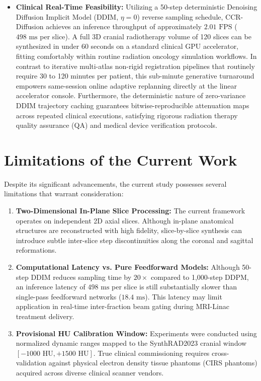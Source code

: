 \begin{itemize}
    \item \textbf{Clinical Real-Time Feasibility:} Utilizing a 50-step deterministic Denoising Diffusion Implicit Model (DDIM, $\eta = 0$) reverse sampling schedule, CCR-Diffusion achieves an inference throughput of approximately $2.01\text{ FPS}$ ($498\text{ ms}$ per slice). A full 3D cranial radiotherapy volume of 120 slices can be synthesized in under 60 seconds on a standard clinical GPU accelerator, fitting comfortably within routine radiation oncology simulation workflows. In contrast to iterative multi-atlas non-rigid registration pipelines that routinely require 30 to 120 minutes per patient, this sub-minute generative turnaround empowers same-session online adaptive replanning directly at the linear accelerator console. Furthermore, the deterministic nature of zero-variance DDIM trajectory caching guarantees bitwise-reproducible attenuation maps across repeated clinical executions, satisfying rigorous radiation therapy quality assurance (QA) and medical device verification protocols.
\end{itemize}

\section{Limitations of the Current Work}
Despite its significant advancements, the current study possesses several limitations that warrant consideration:
\begin{enumerate}
    \item \textbf{Two-Dimensional In-Plane Slice Processing:} The current framework operates on independent 2D axial slices. Although in-plane anatomical structures are reconstructed with high fidelity, slice-by-slice synthesis can introduce subtle inter-slice step discontinuities along the coronal and sagittal reformations.
    \item \textbf{Computational Latency vs. Pure Feedforward Models:} Although 50-step DDIM reduces sampling time by $20\times$ compared to 1,000-step DDPM, an inference latency of $498\text{ ms}$ per slice is still substantially slower than single-pass feedforward networks ($18.4\text{ ms}$). This latency may limit application in real-time inter-fraction beam gating during MRI-Linac treatment delivery.
    \item \textbf{Provisional HU Calibration Window:} Experiments were conducted using normalized dynamic ranges mapped to the SynthRAD2023 cranial window $[-1000\text{ HU}, +1500\text{ HU}]$. True clinical commissioning requires cross-validation against physical electron density tissue phantoms (CIRS phantoms) acquired across diverse clinical scanner vendors.
\end{enumerate}


